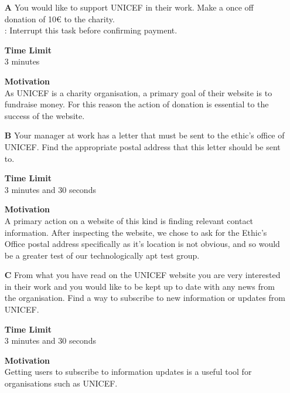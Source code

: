 \begin{itemize}
    \item [\textbf{A}] You would like to support UNICEF in their work.
    Make a once off donation of 10€ to the charity.\\
    \textbf{\color{unicefRed}{Warning}} : Interrupt this task before confirming payment.

    \item [] \textbf{Time Limit}\\
    3 minutes

    \item [] \textbf{Motivation}\\
    As UNICEF is a charity organisation, a primary goal of their website is to fundraise money. 
    For this reason the action of donation is essential to the success of the website. 

    \newpage
    \item [\textbf{B}] Your manager at work has a letter that must be sent to the ethic’s office of UNICEF.
    Find the appropriate postal address that this letter should be sent to.

    \item [] \textbf{Time Limit}\\
    3 minutes and 30 seconds

    \item [] \textbf{Motivation}\\
    A primary action on a website of this kind is finding relevant contact information.
    After inspecting the website, we chose to ask for the Ethic’s Office postal address specifically as it’s location is not obvious, and so would be a greater test of our technologically apt test group. 

    \item [\textbf{C}] From what you have read on the UNICEF website you are very interested in their work and you would like to be kept up to date with any news from the organisation.
    Find a way to subscribe to new information or updates from UNICEF.

    \item [] \textbf{Time Limit}\\
    3 minutes and 30 seconds

    \item [] \textbf{Motivation}\\
    Getting users to subscribe to information updates is a useful tool for organisations such as UNICEF.


\end{itemize}
